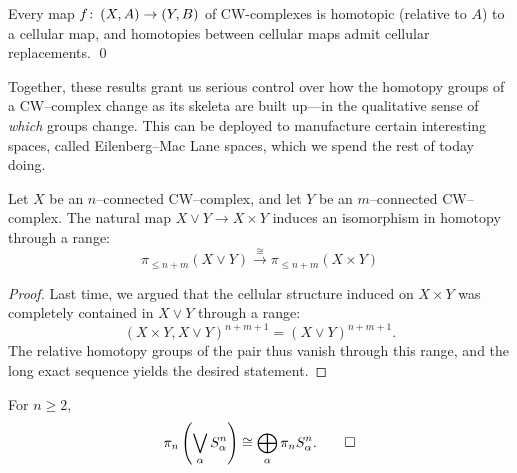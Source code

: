 \begin{corollary}
Every map $f\colon\thinspace (X, A) \to (Y, B)$ of CW-complexes is homotopic (relative to $A$) to a cellular map, and homotopies between cellular maps admit cellular replacements. \qed
\end{corollary}

Together, these results grant us serious control over how the homotopy groups of a CW--complex change as its skeleta are built up---in the qualitative sense of \emph{which} groups change.
This can be deployed to manufacture certain interesting spaces, called Eilenberg--Mac Lane spaces, which we spend the rest of today doing.

\begin{corollary}
Let $X$ be an $n$--connected CW--complex, and let $Y$ be an $m$--connected CW--complex.
The natural map $X \vee Y \to X \times Y$ induces an isomorphism in homotopy through a range: \[\pi_{\le n+m}(X \vee Y) \xrightarrow\cong \pi_{\le n+m}(X \times Y)\]
\end{corollary}
\begin{proof}
Last time, we argued that the cellular structure induced on $X \times Y$ was completely contained in $X \vee Y$ through a range: \[(X \times Y, X \vee Y)^{n+m+1} = (X \vee Y)^{n+m+1}.\]
The relative homotopy groups of the pair thus vanish through this range, and the long exact sequence yields the desired statement.
\end{proof}

\begin{corollary}\label{PinOfSphereBouquet}%
For $n \ge 2$,
\[\pi_n\left(\bigvee_\alpha S^n_\alpha\right) \cong \bigoplus_\alpha \pi_n S^n_\alpha.
\qed\]
\end{corollary}

